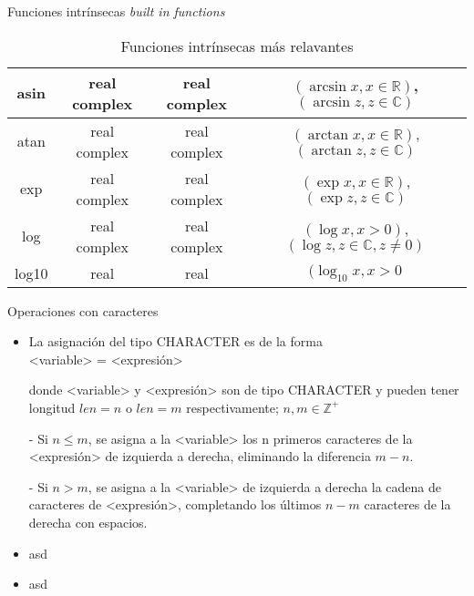 \begin{frame}[fragile]{Funciones intrínsecas \textit{built in functions}}
\begin{table}[]
{\begin{tabular}{|c|c|c|c|}
    asin            & real complex                  & real complex      & $(\arcsin x, x \in \mathbb{R})$, $(\arcsin z, z \in \mathbb{C})$  \\ \hline 
    atan            & real complex                  & real complex      & $(\arctan x, x \in \mathbb{R})$, $(\arctan z, z \in \mathbb{C})$     \\ \hline 
    exp             & real complex                  & real complex      & $(\exp x, x \in \mathbb{R})$, $(\exp z, z \in \mathbb{C})$        \\ \hline 
    log             & real complex                  & real complex      & $(\log x, x > 0)$, $(\log z, z \in \mathbb{C}, z \neq 0)$          \\ \hline 
    log10           & real                          & real              & $(\log_{10} x, x > 0$                                             \\ \hline 
    \end{tabular}}
    \caption*{Funciones intrínsecas más relavantes}
    \end{table}
\end{frame}


\begin{frame}[fragile]{Operaciones con caracteres}
 \begin{itemize}[<+(0)->] 
    \item La asignación del tipo CHARACTER es de la forma \\
      \centering <variable> = <expresión>\\ 
    \item [] donde <variable> y <expresión> son de tipo CHARACTER y pueden tener longitud $len = n$ o $len = m$ respectivamente; $n, m \in \mathbb{Z}^{+}$ 
        \item [-] Si $n \leq m$, se asigna a la <variable> los n primeros caracteres de la <expresión> de izquierda a derecha, eliminando la diferencia $m-n$.
        \item [-] Si $n > m$, se asigna a la <variable> de izquierda a derecha la cadena de caracteres de <expresión>, completando los últimos $n-m$ caracteres de la derecha con espacios.
    \item asd
    \item asd
 \end{itemize}

\end{frame}
